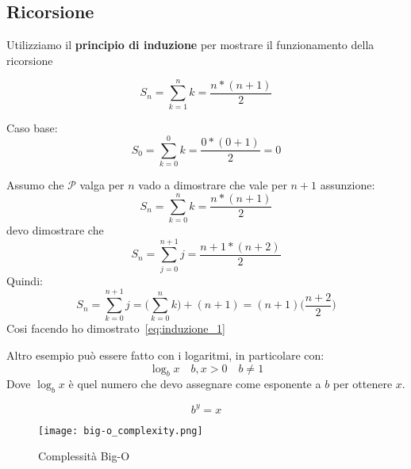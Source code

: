 \documentclass[../main.tex]{subfiles}
\begin{document}
\subsection{Ricorsione}\label{sec:ricorsione}
Utilizziamo il \textbf{principio di induzione} per mostrare il funzionamento della ricorsione

\begin{exmp}
\begin{equation*}
        S_n = \sum_{k=1}^{n} k = \frac{n * (n+1)}{2}
\end{equation*}

Caso base:
\begin{equation*}
        S_0 = \sum_{k=0}^{0} k = \frac{0 * (0+1)}{2} = 0
\end{equation*}
\end{exmp}

Assumo che $ \mathcal{P} $ valga per $ n $ vado a dimostrare che vale per $n+1$ assunzione:
\begin{equation*}
        S_n = \sum_{k=0}^{n} k = \frac{n * (n+1)}{2}
\end{equation*}
devo dimostrare che 
\begin{equation}\label{eq:induzione_1}
        S_n = \sum_{j=0}^{n+1} j = \frac{n+1 * (n+2)}{2}
\end{equation}
Quindi:        
\begin{equation*}
        S_n = \sum_{k=0}^{n+1} j = \Bigg(\sum_{k=0}^{n} k\Bigg)+ (n+1) = (n+1)\Big(\frac{n+2}{2}\Big)
\end{equation*}
Cosi facendo ho dimostrato~\ref{eq:induzione_1}


\newpage

Altro esempio può essere fatto con i logaritmi, in particolare con:
\begin{equation*}
       \boxed{\log_b x \quad b,x > 0 \quad b \not=1}
\end{equation*}
Dove $ \log_b x $ è quel numero che devo assegnare come esponente a $b$ per ottenere $x$.

\begin{equation*}
        b^y = x
\end{equation*}

\begin{figure}[h!]
        \texttt{[image: big-o\_complexity.png]}
        \caption{Complessità Big-O}
\end{figure}
\end{document}
